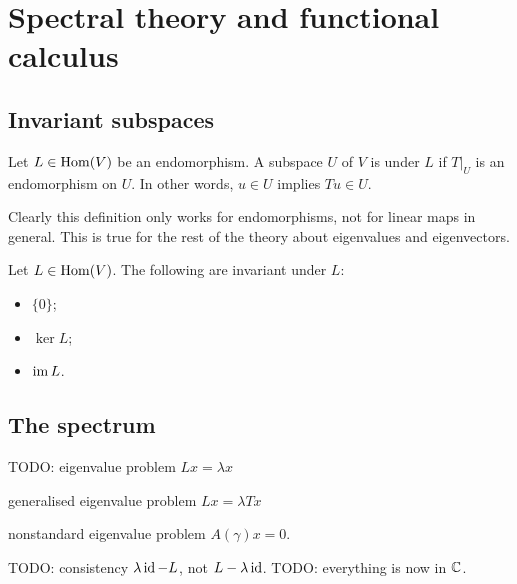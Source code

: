 









\chapter{Spectral theory and functional calculus}
\section{Invariant subspaces}
\begin{definition}
Let $L\in \operatorname{Hom}(V)$ be an endomorphism. A subspace $U$ of $V$ is  under $L$ if $T|_U$ is an endomorphism on $U$. In other words, $u\in U$ implies $Tu\in U$.
\end{definition}
Clearly this definition only works for endomorphisms, not for linear maps in general. This is true for the rest of the theory about eigenvalues and eigenvectors.
\begin{example}
Let $L\in \operatorname{Hom}(V)$. The following are invariant under $L$:
\begin{itemize}
\item $\{0\}$;
\item $\ker L$;
\item $\operatorname{im} L$.
\end{itemize}
\end{example}

\section{The spectrum}
TODO: eigenvalue problem $Lx = \lambda x$

generalised eigenvalue problem $Lx = \lambda T x$

nonstandard eigenvalue problem $A(\gamma)x = 0$.

TODO: consistency $\lambda \operatorname{id} - L$, not $L-\lambda \operatorname{id}$.
TODO: everything is now in $\mathbb{C}$.

